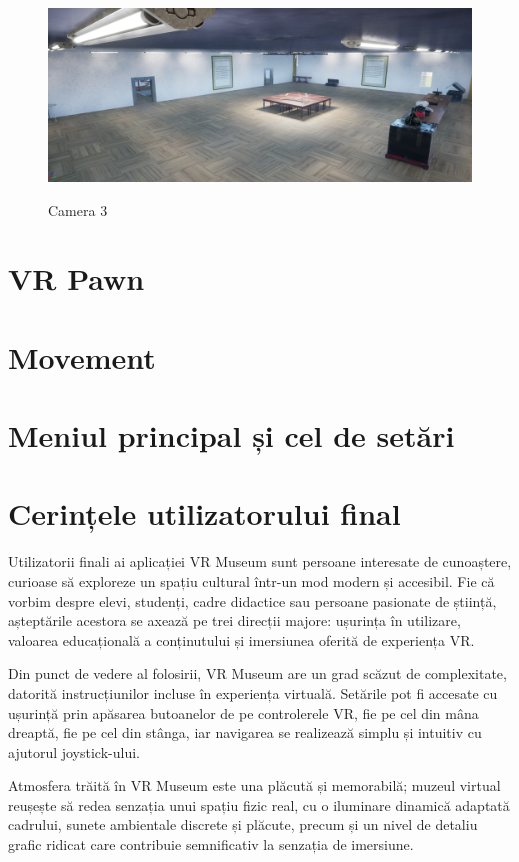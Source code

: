 \begin{figure} [htp] 
\centering 
\includegraphics [width=12cm]
{continut/capitol3/figuri/iteme.png} 
\label{fig:Room3} 
    \caption{Camera 3}
\end{figure}

\section{VR Pawn}

\section{Movement}

\section{Meniul principal și cel de setări}

\section{Cerințele utilizatorului final}

Utilizatorii finali ai aplicației VR Museum sunt persoane interesate de cunoaștere, curioase să exploreze un spațiu cultural într-un mod modern și accesibil. Fie că vorbim despre elevi, studenți, cadre didactice sau persoane pasionate de știință, așteptările acestora se axează pe trei direcții majore: ușurința în utilizare, valoarea educațională a conținutului și imersiunea oferită de experiența VR.

Din punct de vedere al folosirii, VR Museum are un grad scăzut de complexitate, datorită instrucțiunilor incluse în experiența virtuală. Setările pot fi accesate cu ușurință prin apăsarea butoanelor de pe controlerele VR, fie pe cel din mâna dreaptă, fie pe cel din stânga, iar navigarea se realizează simplu și intuitiv cu ajutorul joystick-ului.

Atmosfera trăită în VR Museum este una plăcută și memorabilă; muzeul virtual reușește să redea senzația unui spațiu fizic real, cu o iluminare dinamică adaptată cadrului, sunete ambientale discrete și plăcute, precum și un nivel de detaliu grafic ridicat care contribuie semnificativ la senzația de imersiune.

